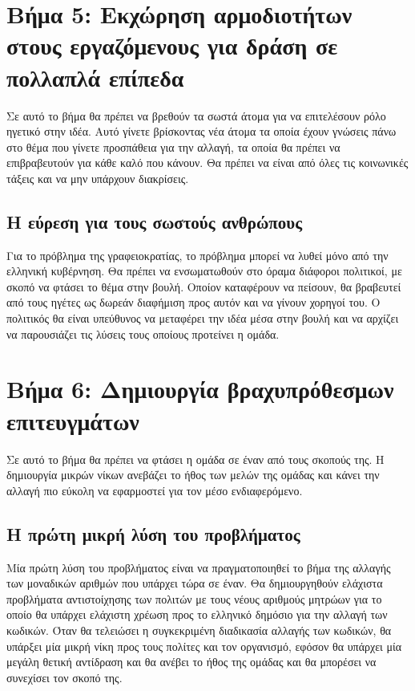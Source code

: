\documentclass{fphw}
\begin{document}
    \section*{Βήμα 5: Εκχώρηση αρμοδιοτήτων στους εργαζόμενους για δράση σε πολλαπλά επίπεδα}

    \begin{problem}
        Σε αυτό το βήμα θα πρέπει να βρεθούν τα σωστά άτομα για να επιτελέσουν ρόλο
        ηγετικό στην ιδέα. Αυτό γίνετε βρίσκοντας νέα άτομα τα οποία έχουν γνώσεις πάνω στο θέμα
        που γίνετε προσπάθεια για την αλλαγή, τα οποία θα πρέπει να επιβραβευτούν για κάθε καλό που κάνουν.
        Θα πρέπει να είναι από όλες τις κοινωνικές τάξεις και να μην υπάρχουν διακρίσεις.
    \end{problem}

    \subsection*{Η εύρεση για τους σωστούς ανθρώπους}
    Για το πρόβλημα της γραφειοκρατίας, το πρόβλημα μπορεί να λυθεί μόνο από την ελληνική κυβέρνηση.
    Θα πρέπει να ενσωματωθούν στο όραμα διάφοροι πολιτικοί, με σκοπό να φτάσει το θέμα στην βουλή.
    Οποίον καταφέρουν να πείσουν, θα βραβευτεί από τους ηγέτες ως δωρεάν διαφήμιση προς αυτόν και να γίνουν χορηγοί του.
    Ο πολιτικός θα είναι υπεύθυνος να μεταφέρει την ιδέα μέσα στην βουλή και να αρχίζει να παρουσιάζει τις λύσεις
    τους οποίους προτείνει η ομάδα.

    \newpage
    \section*{Βήμα 6: Δημιουργία βραχυπρόθεσμων επιτευγμάτων}

    \begin{problem}
        Σε αυτό το βήμα θα πρέπει να φτάσει η ομάδα σε έναν από τους σκοπούς της.
        Η δημιουργία μικρών νίκων ανεβάζει το ήθος των μελών της ομάδας και κάνει την αλλαγή
        πιο εύκολη να εφαρμοστεί για τον μέσο ενδιαφερόμενο.
    \end{problem}

    \subsection*{Η πρώτη μικρή λύση του προβλήματος}
    Μία πρώτη λύση του προβλήματος είναι να πραγματοποιηθεί το βήμα της αλλαγής των μοναδικών αριθμών που
    υπάρχει τώρα σε έναν. Θα δημιουργηθούν ελάχιστα προβλήματα αντιστοίχησης των πολιτών με τους νέους αριθμούς μητρώων
    για το οποίο θα υπάρχει ελάχιστη χρέωση προς το ελληνικό δημόσιο για την αλλαγή των κωδικών.
    Όταν θα τελειώσει η συγκεκριμένη διαδικασία αλλαγής των κωδικών, θα υπάρξει μία μικρή νίκη προς τους πολίτες και τον οργανισμό,
    εφόσον θα υπάρχει μία μεγάλη θετική αντίδραση και θα ανέβει το ήθος της ομάδας και θα μπορέσει να συνεχίσει τον σκοπό της.
\end{document}
